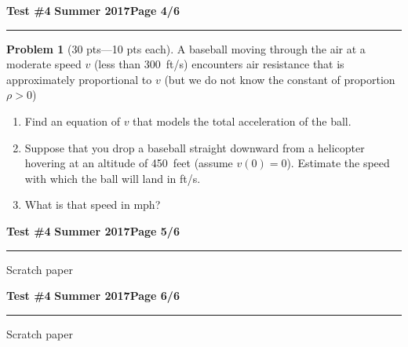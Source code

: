 \documentclass[12pt]{article}
\theoremstyle{definition}
\newtheorem{problem}{Problem}
\begin{document}
\newpage

\hfill{\large\bf Test \#4}\hfill{\large\bf
  Summer 2017}\hfill{\large\bf Page 4/6}\hrule

\bigskip
\begin{problem}[30 pts---10 pts each]
A baseball moving through the air at a moderate speed $v$ (less than 300~ft/s) encounters air resistance that is approximately proportional to $v$ (but we do not know the constant of proportion $\rho>0$)
\begin{enumerate}
\item Find an equation of $v$ that models the total acceleration of the ball.
\vspace{2cm}
\begin{flushright}
\end{flushright}
\item Suppose that you drop a baseball straight downward from a helicopter hovering at an altitude of 450~feet (assume $v(0)=0$).  Estimate the speed with which the ball will land in ft/s.
\vspace{10cm}
\begin{flushright}
\end{flushright}
\item What is that speed in mph?
\vspace{0.8cm}
\begin{flushright}
\end{flushright}
\end{enumerate} 
\end{problem}

\hfill{\large\bf Test \#4}\hfill{\large\bf
  Summer 2017}\hfill{\large\bf Page 5/6}\hrule

\bigskip
\Large Scratch paper

\newpage

\hfill{\large\bf Test \#4}\hfill{\large\bf
  Summer 2017}\hfill{\large\bf Page 6/6}\hrule

\bigskip
\Large Scratch paper
\end{document}
